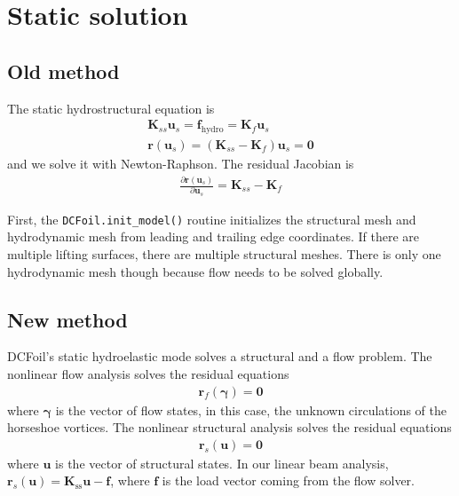 \documentclass[10pt]{article}
\newcommand{\pp}[2]{\frac{\partial #1}{\partial #2}}
\newcommand{\mbf}[1]{\mathbf{#1}}
\newcommand{\mbs}[1]{\boldsymbol{#1}}
\newcommand{\be}{\begin{eqnarray}}
\newcommand{\ee}{\end{eqnarray}}
\newcommand{\beq}{\begin{equation}\begin{aligned}}
\newcommand{\eeq}{\end{aligned}\end{equation}}
\newcommand{\Uinf}{U_{\infty}}
\newcommand{\tn}[1]{\textrm{#1}}
\begin{document}

\section{Static solution}

\subsection{Old method}
The static hydrostructural equation is
\be
\mbf{K}_{ss} \mbf{u}_s   = \mbf{f}_{\tn{hydro}} = \mbf{K}_f \mbf{u}_s
\\
\mbf{r}(\mbf{u}_s) = \left(\mbf{K}_{ss} - \mbf{K}_f\right)\mbf{u}_s  = \mbf{0}
\ee
and we solve it with Newton-Raphson.
The residual Jacobian is
\be
\pp{\mbf{r}(\mbf{u}_s)}{\mbf{u}_s}
=
\mbf{K}_{ss} - \mbf{K}_{f}
\ee

First, the \texttt{DCFoil.init\_model()} routine initializes the structural mesh and hydrodynamic mesh from leading and trailing edge coordinates.
If there are multiple lifting surfaces, there are multiple structural meshes.
There is only one hydrodynamic mesh though because flow needs to be solved globally.

\subsection{New method}
DCFoil's static hydroelastic mode solves a structural and a flow problem.
The nonlinear flow analysis solves the residual equations
\beq
\mbf{r}_f(\mbs{\gamma}) = \mbf{0}
\eeq
where $\mbs{\gamma}$ is the vector of flow states, in this case, the unknown circulations of the horseshoe vortices.
The nonlinear structural analysis solves the residual equations
\beq
\mbf{r}_s(\mbf{u}) = \mbf{0}
\eeq
where $\mbf{u}$ is the vector of structural states.
In our linear beam analysis, $\mbf{r}_s(\mbf{u}) = \mbf{K}_\tn{ss} \mbf{u} - \mbf{f}$, where $\mbf{f}$ is the load vector coming from the flow solver.
\end{document}
